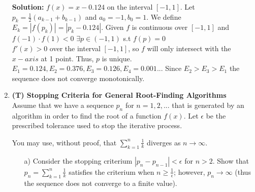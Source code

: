 \documentclass[12pt]{article}
\begin{document}
\begin{enumerate}[label=\bfseries Problem \arabic*:]
    \textbf{Solution:} \newline
    $f(x)=x-0.124$ on the interval $[-1,1]$. Let $p_k=\frac{1}{2}(a_{k-1}+b_{k-1})$ and $a_0=-1,b_0=1$. We define $E_k=|f(p_k)|=|p_k-0.124|$. \newline
    Given $f$ is continuous over $[-1,1]$ and $f(-1) \cdot f(1)<0$ $\exists p\in(-1,1)$ s.t $f(p)=0$\\
    $f'(x)>0$ over the interval $[-1,1]$, so $f$ will only intersect with the $x-axis$ at 1 point. Thus, $p$ is unique.\\
    $E_1=0.124,E_2=0.376,E_3=0.126,E_4=0.001...$ \newline
    Since $E_2>E_3>E_1$ the sequence does not converge monotonically.
    
   
 
     
    \newpage 
    \item \textbf{(T) Stopping Criteria for General Root-Finding Algorithms}\\
    Assume that we have a sequence $p_n$ for $n=1,2,...$ that is generated by an algorithm in order to find the root of a function $f(x)$. Let $\epsilon$ be the prescribed tolerance used to stop the iterative process. 
    
    You may use, without proof, that  $\sum_{k=1}^n \frac{1}{k}$ diverges as $n\rightarrow \infty$.
    
    
    
    \begin{itemize}
    \item[a)] Consider the stopping criterium $|p_{n}-p_{n-1}|< \epsilon$ for $n>2$. Show that $p_n=\sum_{k=1}^n \frac{1}{k}$ satisfies the criterium when $n\geq\frac{1}{\epsilon}$; however, $p_n \rightarrow \infty$  (thus the sequence does not converge to a finite value).
    

\end{itemize}
\end{enumerate}
\end{document}
